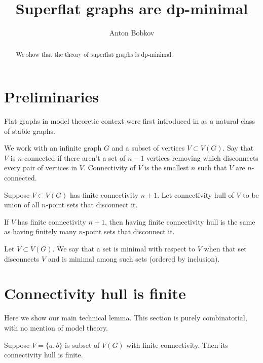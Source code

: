 \documentclass{amsart}
\begin{document}
\title{Superflat graphs are dp-minimal}
\author{Anton Bobkov}

\begin{abstract}
	We show that the theory of superflat graphs is dp-minimal.
\end{abstract}

\maketitle

\section{Preliminaries}

Flat graphs in model theoretic context were first introduced in  as a natural class of stable graphs.

We work with an infinite graph $G$ and a subset of vertices $V \subset V(G)$. Say that $V$ is $n$-connected if there aren't a set of $n-1$ vertices removing which disconnects every pair of vertices in $V$. Connectivity of $V$ is the smallest $n$ such that $V$ are $n$-connected.

\begin{Definition}
	Suppose $V \subset V(G)$ has finite connectivity $n+1$. Let connectivity hull of $V$ to be union of all $n$-point sets that disconnect it.
\end{Definition}

\begin{Note}
	If $V$ has finite connectivity $n+1$, then having finite connectivity hull is the same as having finitely many $n$-point sets that disconnect it.
\end{Note}

\begin{Definition}
	Let $V \subset V(G)$. We say that a set is minimal with respect to $V$ when that set disconnects $V$ and is minimal among such sets (ordered by inclusion).
\end{Definition}

\section{Connectivity hull is finite}

Here we show our main technical lemma. This section is purely combinatorial, with no mention of model theory.

\begin{Lemma}
	Suppose $V = \{a,b\}$ is subset of  $V(G)$ with finite connectivity. Then its connectivity hull is finite.
\end{Lemma}
\end{document}
